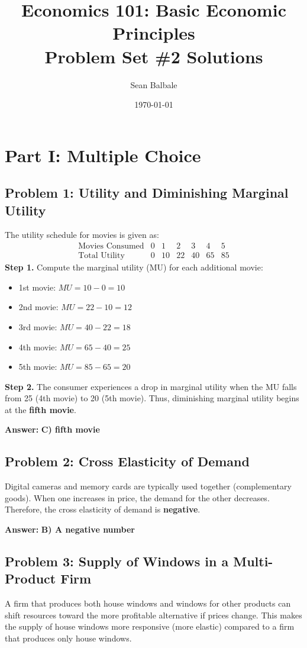 \documentclass[12pt]{article}
\title{Economics 101: Basic Economic Principles\\Problem Set \#2 Solutions}
\author{Sean Balbale}
\date{\today}
\begin{document}
\maketitle

\section*{Part I: Multiple Choice}

\subsection*{Problem 1: Utility and Diminishing Marginal Utility}
The utility schedule for movies is given as:
\[
    \begin{array}{c|cccccc}
        \text{Movies Consumed} & 0 & 1  & 2  & 3  & 4  & 5  \\\hline
        \text{Total Utility}   & 0 & 10 & 22 & 40 & 65 & 85
    \end{array}
\]
\textbf{Step 1.} Compute the marginal utility (MU) for each additional movie:
\begin{itemize}[noitemsep]
    \item 1st movie: \(MU = 10 - 0 = 10\)
    \item 2nd movie: \(MU = 22 - 10 = 12\)
    \item 3rd movie: \(MU = 40 - 22 = 18\)
    \item 4th movie: \(MU = 65 - 40 = 25\)
    \item 5th movie: \(MU = 85 - 65 = 20\)
\end{itemize}
\textbf{Step 2.} The consumer experiences a drop in marginal utility when the MU falls from 25 (4th movie) to 20 (5th movie). Thus, diminishing marginal utility begins at the \textbf{fifth movie}.

\textbf{Answer:} \textbf{C) fifth movie}

\subsection*{Problem 2: Cross Elasticity of Demand}
Digital cameras and memory cards are typically used together (complementary goods). When one increases in price, the demand for the other decreases. Therefore, the cross elasticity of demand is \textbf{negative}.

\textbf{Answer:} \textbf{B) A negative number}

\subsection*{Problem 3: Supply of Windows in a Multi-Product Firm}
A firm that produces both house windows and windows for other products can shift resources toward the more profitable alternative if prices change. This makes the supply of house windows more responsive (more elastic) compared to a firm that produces only house windows.
\end{document}
